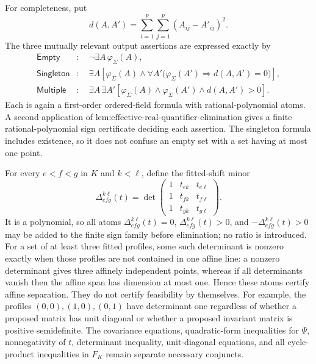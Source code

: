 For completeness, put
\[
 d(A,A')=\sum_{i=1}^p\sum_{j=1}^p(A_{ij}-A'_{ij})^2.
\]
The three mutually relevant output assertions are expressed exactly by
\[
\begin{aligned}
 \mathsf{Empty}&:\quad \neg\exists A\,\varphi_\Sigma(A),\\
 \mathsf{Singleton}&:\quad
   \exists A\left[\varphi_\Sigma(A)\wedge
   \forall A'\bigl(\varphi_\Sigma(A')\Rightarrow d(A,A')=0\bigr)\right],\\
 \mathsf{Multiple}&:\quad
   \exists A\,\exists A'\left[
   \varphi_\Sigma(A)\wedge\varphi_\Sigma(A')\wedge d(A,A')>0\right].
\end{aligned}
\]
Each is again a first-order ordered-field formula with rational-polynomial atoms.  A second application of \(\text{lem:effective-real-quantifier-elimination}\) gives a finite rational-polynomial sign certificate deciding each assertion.  The singleton formula includes existence, so it does not confuse an empty set with a set having at most one point.

For every \(e<f<g\) in \(K\) and \(k<\ell\), define the fitted-shift minor
\[
 \Delta_{efg}^{k\ell}(t)=
 \det\begin{pmatrix}
 1&t_{ek}&t_{e\ell}\\
 1&t_{fk}&t_{f\ell}\\
 1&t_{gk}&t_{g\ell}
 \end{pmatrix}.
\]
It is a polynomial, so all atoms \(\Delta_{efg}^{k\ell}(t)=0\), \(\Delta_{efg}^{k\ell}(t)>0\), and \(-\Delta_{efg}^{k\ell}(t)>0\) may be added to the finite sign family before elimination; no ratio is introduced.  For a set of at least three fitted profiles, some such determinant is nonzero exactly when those profiles are not contained in one affine line: a nonzero determinant gives three affinely independent points, whereas if all determinants vanish then the affine span has dimension at most one.  Hence these atoms certify affine separation.  They do not certify feasibility by themselves.  For example, the profiles \((0,0),(1,0),(0,1)\) have determinant one regardless of whether a proposed matrix has unit diagonal or whether a proposed invariant matrix is positive semidefinite.  The covariance equations, quadratic-form inequalities for \(\Psi\), nonnegativity of \(t\), determinant inequality, unit-diagonal equations, and all cycle-product inequalities in \(F_K\) remain separate necessary conjuncts.

